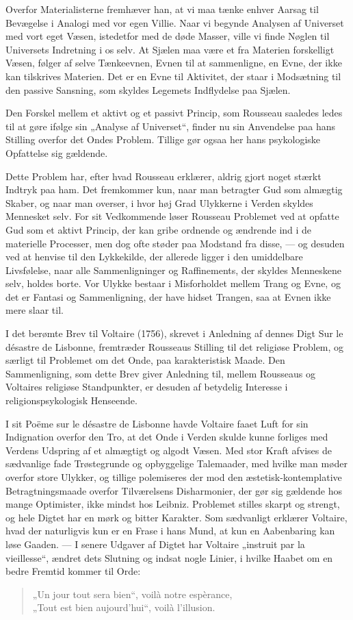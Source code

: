 \documentclass[12pt,a4paper,openany]{book}
\newcommand{\opage}[1]{\marginnote{\footnotesize\textit{[#1]}}}
\begin{document}
Overfor Materialisterne fremhæver han, at vi maa tænke
enhver Aarsag til Bevægelse i Analogi med vor egen Villie.
Naar vi begynde Analysen af Universet med vort eget Væsen,
istedetfor med de døde Masser, ville vi finde Nøglen til Universets
Indretning i os selv. At Sjælen maa være et fra Materien
forskelligt Væsen, følger af selve Tænkeevnen, Evnen til
at sammenligne, en Evne, der ikke kan tilskrives Materien. Det
er en Evne til Aktivitet, der staar i Modsætning til den passive
Sansning, som skyldes Legemets Indflydelse paa Sjælen.

Den Forskel mellem et aktivt og et passivt Princip, som
Rousseau saaledes ledes til at gøre ifølge sin „Analyse af Universet“,
finder nu sin Anvendelse paa hans Stilling overfor det
Ondes Problem. Tillige gør ogsaa her hans psykologiske Opfattelse
sig gældende.

Dette Problem har, efter hvad Rousseau erklærer, aldrig
gjort noget stærkt Indtryk paa ham. Det fremkommer kun, naar
man betragter Gud som almægtig Skaber, og naar man overser,
i hvor høj Grad Ulykkerne i Verden skyldes Mennesket selv.
For sit Vedkommende løser Rousseau Problemet ved at opfatte
\setcounter{footnote}{0}%
\opage{152}Gud som et aktivt Princip, der kan gribe ordnende og ændrende
ind i de materielle Processer, men dog ofte støder paa Modstand
fra disse, --- og desuden ved at henvise til den Lykkekilde,
der allerede ligger i den umiddelbare Livsfølelse, naar
alle Sammenligninger og Raffinements, der skyldes Menneskene
selv, holdes borte. Vor Ulykke bestaar i Misforholdet mellem
Trang og Evne, og det er Fantasi og Sammenligning, der have
hidset Trangen, saa at Evnen ikke mere slaar til.

I det berømte Brev til Voltaire (1756), skrevet i Anledning
af dennes Digt Sur le désastre de Lisbonne, fremtræder Rousseaus
Stilling til det religiøse Problem, og særligt til Problemet
om det Onde, paa karakteristisk Maade. Den Sammenligning,
som dette Brev giver Anledning til, mellem Rousseaus og Voltaires
religiøse Standpunkter, er desuden af betydelig Interesse
i religionspsykologisk Henseende.

I sit Poëme sur le désastre de Lisbonne havde Voltaire
faaet Luft for sin Indignation overfor den Tro, at det Onde i
Verden skulde kunne forliges med Verdens Udspring af et almægtigt
og algodt Væsen. Med stor Kraft afvises de sædvanlige
fade Trøstegrunde og opbyggelige Talemaader, med hvilke
man møder overfor store Ulykker, og tillige polemiseres der
mod den æstetisk-kontemplative Betragtningsmaade overfor Tilværelsens
Disharmonier, der gør sig gældende hos mange Optimister,
ikke mindst hos Leibniz. Problemet stilles skarpt og
strengt, og hele Digtet har en mørk og bitter Karakter. Som
sædvanligt erklærer Voltaire, hvad der naturligvis kun er en
Frase i hans Mund, at kun en Aabenbaring kan løse Gaaden.
--- I senere Udgaver af Digtet har Voltaire „instruit par la
vieillesse“, ændret dets Slutning og indsat nogle Linier, i hvilke
Haabet om en bedre Fremtid kommer til Orde:
\begin{quote}
„Un jour tout sera bien“, voilà notre espèrance,\\
„Tout est bien aujourd’hui“, voilà l’illusion.
\end{quote}
\end{document}
